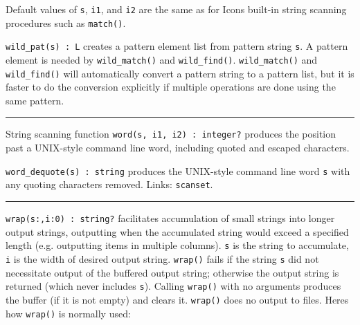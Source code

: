 Default values of \texttt{s}, \texttt{i1}, and \texttt{i2} are the same
as for Icon{\textquotesingle}s built-in string scanning procedures such
as \texttt{match()}.

\texttt{wild\_pat(s) : L} creates a pattern element list from pattern
string \texttt{s}. A pattern element is needed by
\texttt{wild\_match()} and \texttt{wild\_find()}.
\texttt{wild\_match()} and \texttt{wild\_find()} will automatically
convert a pattern string to a pattern list, but it is faster to do the
conversion explicitly if multiple operations are done using the same
pattern.

\vspace{0.25cm}\hrule{}

String scanning function \texttt{word(s, i1, i2) : integer?} produces
the position past a UNIX-style command line word, including quoted and
escaped characters.

\texttt{word\_dequote(s) : string} produces the UNIX-style command line
word \texttt{s} with any quoting characters removed.
Links: \texttt{scanset}.

\vspace{0.25cm}\hrule{}

\texttt{wrap}\texttt{(s:{\textquotedbl}{\textquotedbl},i:0)
: string?} facilitates accumulation of small strings into longer output
strings, outputting when the accumulated string would exceed a
specified length (e.g. outputting items in multiple columns).
\texttt{s} is the string to accumulate, \texttt{i} is the width of
desired output string. \texttt{wrap()} fails if the string \texttt{s}
did not necessitate output of the buffered output string; otherwise the
output string is returned (which never includes \texttt{s}). Calling
\texttt{wrap()} with no arguments produces the buffer (if it is not
empty) and clears it. \texttt{wrap()} does no output to files.
Here{\textquotesingle}s how \texttt{wrap()} is normally used:


